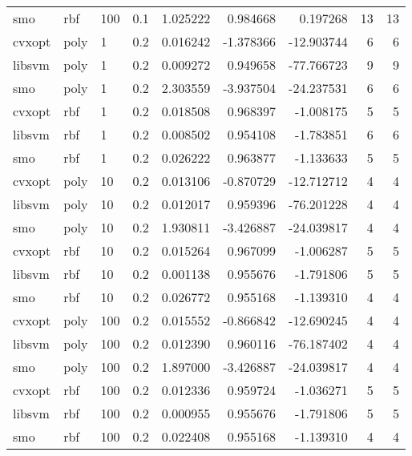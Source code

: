 \begin{tabular}{llllrrrrr}
   smo &    rbf & 100 &     0.1 &    1.025222 &  0.984668 &    0.197268 &           13 &         13 \\
cvxopt &   poly &   1 &     0.2 &    0.016242 & -1.378366 &  -12.903744 &            6 &          6 \\
libsvm &   poly &   1 &     0.2 &    0.009272 &  0.949658 &  -77.766723 &            9 &          9 \\
   smo &   poly &   1 &     0.2 &    2.303559 & -3.937504 &  -24.237531 &            6 &          6 \\
cvxopt &    rbf &   1 &     0.2 &    0.018508 &  0.968397 &   -1.008175 &            5 &          5 \\
libsvm &    rbf &   1 &     0.2 &    0.008502 &  0.954108 &   -1.783851 &            6 &          6 \\
   smo &    rbf &   1 &     0.2 &    0.026222 &  0.963877 &   -1.133633 &            5 &          5 \\
cvxopt &   poly &  10 &     0.2 &    0.013106 & -0.870729 &  -12.712712 &            4 &          4 \\
libsvm &   poly &  10 &     0.2 &    0.012017 &  0.959396 &  -76.201228 &            4 &          4 \\
   smo &   poly &  10 &     0.2 &    1.930811 & -3.426887 &  -24.039817 &            4 &          4 \\
cvxopt &    rbf &  10 &     0.2 &    0.015264 &  0.967099 &   -1.006287 &            5 &          5 \\
libsvm &    rbf &  10 &     0.2 &    0.001138 &  0.955676 &   -1.791806 &            5 &          5 \\
   smo &    rbf &  10 &     0.2 &    0.026772 &  0.955168 &   -1.139310 &            4 &          4 \\
cvxopt &   poly & 100 &     0.2 &    0.015552 & -0.866842 &  -12.690245 &            4 &          4 \\
libsvm &   poly & 100 &     0.2 &    0.012390 &  0.960116 &  -76.187402 &            4 &          4 \\
   smo &   poly & 100 &     0.2 &    1.897000 & -3.426887 &  -24.039817 &            4 &          4 \\
cvxopt &    rbf & 100 &     0.2 &    0.012336 &  0.959724 &   -1.036271 &            5 &          5 \\
libsvm &    rbf & 100 &     0.2 &    0.000955 &  0.955676 &   -1.791806 &            5 &          5 \\
   smo &    rbf & 100 &     0.2 &    0.022408 &  0.955168 &   -1.139310 &            4 &          4 \\

\end{tabular}
